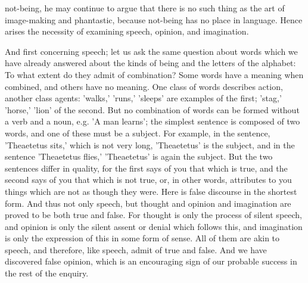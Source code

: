 \documentclass[11pt,letter]{article}
\begin{document}
not-being, he may continue to argue that there is no such thing as the art of image-making and phantastic, because not-being has no place in language. Hence arises the necessity of examining speech, opinion, and imagination.

\par  And first concerning speech; let us ask the same question about words which we have already answered about the kinds of being and the letters of the alphabet: To what extent do they admit of combination? Some words have a meaning when combined, and others have no meaning. One class of words describes action, another class agents: 'walks,' 'runs,' 'sleeps' are examples of the first; 'stag,' 'horse,' 'lion' of the second. But no combination of words can be formed without a verb and a noun, e.g. 'A man learns'; the simplest sentence is composed of two words, and one of these must be a subject. For example, in the sentence, 'Theaetetus sits,' which is not very long, 'Theaetetus' is the subject, and in the sentence 'Theaetetus flies,' 'Theaetetus' is again the subject. But the two sentences differ in quality, for the first says of you that which is true, and the second says of you that which is not true, or, in other words, attributes to you things which are not as though they were. Here is false discourse in the shortest form. And thus not only speech, but thought and opinion and imagination are proved to be both true and false. For thought is only the process of silent speech, and opinion is only the silent assent or denial which follows this, and imagination is only the expression of this in some form of sense. All of them are akin to speech, and therefore, like speech, admit of true and false. And we have discovered false opinion, which is an encouraging sign of our probable success in the rest of the enquiry.
\end{document}
